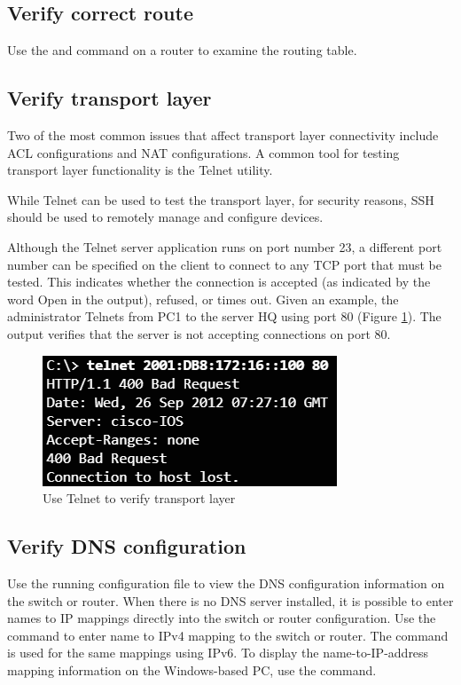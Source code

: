 \subsection{Verify correct route}

Use the and  command on a router to examine the routing table. 

\subsection{Verify transport layer}

Two of the most common issues that affect transport layer connectivity include ACL configurations and NAT configurations. A common tool for testing transport layer functionality is the Telnet utility.

\note While Telnet can be used to test the transport layer, for security reasons, SSH should be used to remotely manage and configure devices.

Although the Telnet server application runs on port number 23, a different port number can be specified on the client to connect to any TCP port that must be tested. This indicates whether the connection is accepted (as indicated by the word Open in the output), refused, or times out. Given an example, the administrator Telnets from PC1 to the server HQ using port 80 (Figure \ref{Telnet}). The output verifies that the server is not accepting connections on port 80.

\begin{figure}[hbtp]
\caption{Use Telnet to verify transport layer}\label{Telnet}
\centering
\includegraphics[scale=0.8]{pictures/Telnet.PNG}
\end{figure}

\subsection{Verify DNS configuration}

Use the running configuration file to view the DNS configuration information on the switch or router. When there is no DNS server installed, it is possible to enter names to IP mappings directly into the switch or router configuration. Use the  command to enter name to IPv4 mapping to the switch or router. The  command is used for the same mappings using IPv6. To display the name-to-IP-address mapping information on the Windows-based PC, use the  command.

